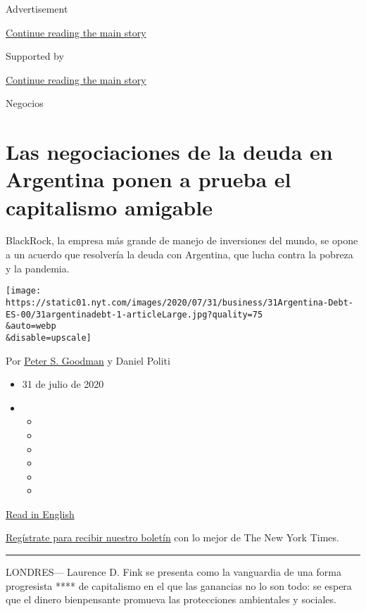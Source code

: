 Advertisement

\protect\hyperlink{after-top}{Continue reading the main story}

Supported by

\protect\hyperlink{after-sponsor}{Continue reading the main story}

Negocios

\hypertarget{las-negociaciones-de-la-deuda-en-argentina-ponen-a-prueba-el-capitalismo-amigable}{%
\section{Las negociaciones de la deuda en Argentina ponen a prueba el
capitalismo
amigable}\label{las-negociaciones-de-la-deuda-en-argentina-ponen-a-prueba-el-capitalismo-amigable}}

BlackRock, la empresa más grande de manejo de inversiones del mundo, se
opone a un acuerdo que resolvería la deuda con Argentina, que lucha
contra la pobreza y la pandemia.

\texttt{[image: https://static01.nyt.com/images/2020/07/31/business/31Argentina-Debt-ES-00/31argentinadebt-1-articleLarge.jpg?quality=75\\\&auto=webp\\\&disable=upscale]}

Por \href{https://www.nytimes.com/by/peter-s-goodman}{Peter S. Goodman}
y Daniel Politi

\begin{itemize}
\item
  31 de julio de 2020
\item
  \begin{itemize}
  \item
  \item
  \item
  \item
  \item
  \item
  \end{itemize}
\end{itemize}

\href{https://www.nytimes.com/2020/07/31/business/argentina-debt.html}{Read
in English}

\href{https://www.nytimes.com/newsletters/el-times}{Regístrate para
recibir nuestro boletín} con lo mejor de The New York Times.

\begin{center}\rule{0.5\linewidth}{\linethickness}\end{center}

LONDRES--- Laurence D. Fink se presenta como la vanguardia de una forma
progresista **** de capitalismo en el que las ganancias no lo son todo:
se espera que el dinero bienpensante promueva las protecciones
ambientales y sociales.

